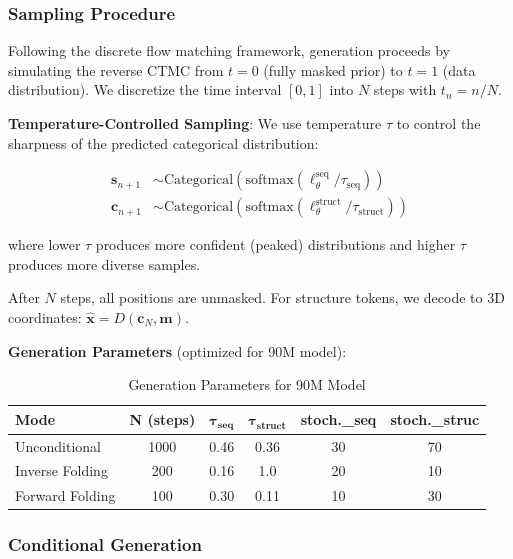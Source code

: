 \documentclass[11pt,a4paper]{article}
\begin{document}
\subsubsection{Sampling Procedure}

Following the discrete flow matching framework, generation proceeds by simulating the reverse CTMC from $t=0$ (fully masked prior) to $t=1$ (data distribution). We discretize the time interval $[0,1]$ into $N$ steps with $t_n = n/N$.

\textbf{Temperature-Controlled Sampling}: We use temperature $\tau$ to control the sharpness of the predicted categorical distribution:

\begin{align}
\mathbf{s}_{n+1} &\sim \text{Categorical}(\text{softmax}(\ell_\theta^{\text{seq}} / \tau_{\text{seq}})) \\
\mathbf{c}_{n+1} &\sim \text{Categorical}(\text{softmax}(\ell_\theta^{\text{struct}} / \tau_{\text{struct}}))
\end{align}

where lower $\tau$ produces more confident (peaked) distributions and higher $\tau$ produces more diverse samples.

After $N$ steps, all positions are unmasked. For structure tokens, we decode to 3D coordinates: $\hat{\mathbf{x}} = D(\mathbf{c}_N, \mathbf{m})$.

\textbf{Generation Parameters} (optimized for 90M model):

\begin{table}[h]
\centering
\caption{Generation Parameters for 90M Model}
\begin{tabular}{@{}lccccc@{}}
\toprule
\textbf{Mode} & \textbf{N (steps)} & $\boldsymbol{\tau_{\text{seq}}}$ & $\boldsymbol{\tau_{\text{struct}}}$ & \textbf{stoch.\_seq} & \textbf{stoch.\_struc} \\
\midrule
Unconditional & 1000 & 0.46 & 0.36 & 30 & 70 \\
Inverse Folding & 200 & 0.16 & 1.0 & 20 & 10 \\
Forward Folding & 100 & 0.30 & 0.11 & 10 & 30 \\
\bottomrule
\end{tabular}
\label{tab:gen_params}
\end{table}

\subsubsection{Conditional Generation}
\end{document}

